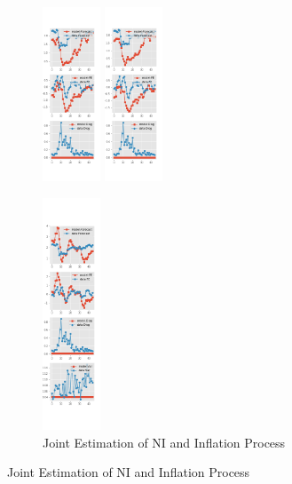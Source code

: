 \documentclass[]{article}
\begin{document}
\begin{figure}[ht]
\begin{subfigure}[b]{\textwidth}
		\includegraphics[width=0.19\textwidth]{figures/spf_ni_est_diag3.png}
		\includegraphics[width=0.19\textwidth]{figures/spf_ni_est_diag4.png}
	\end{subfigure}
	\vspace{1em}
	\vfill
	\begin{subfigure}[b]{\textwidth}
		\centering
		\caption{Joint Estimation of NI and Inflation Process}
		\label{NI_diag_joint_SPF}
		\includegraphics[width=0.19\textwidth]{figures/spf_ni_est_joint_diag0.png}

\end{subfigure}
\end{figure}
\end{document}
